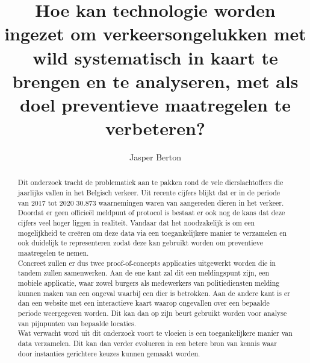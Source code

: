 \documentclass{hogent-article}
\title{Hoe kan technologie worden ingezet om verkeersongelukken met wild systematisch in kaart te brengen en te analyseren, met als doel preventieve maatregelen te verbeteren? }
\author{Jasper Berton}
\begin{document}
\begin{abstract}
    
   Dit onderzoek tracht de problematiek aan te pakken rond de vele dierslachtoffers die jaarlijks vallen in het Belgisch verkeer. Uit recente cijfers blijkt dat er in de periode van 2017 tot 2020 30.873 waarnemingen waren van aangereden dieren in het verkeer. Doordat er geen officieël meldpunt of protocol is bestaat er ook nog de kans dat deze cijfers veel hoger liggen in realiteit. Vandaar dat het noodzakelijk is om een mogelijkheid te creëren om deze data via een toegankelijkere manier te verzamelen en ook duidelijk te representeren zodat deze kan gebruikt worden om preventieve maatregelen te nemen. \\
   
   Concreet zullen er dus twee proof-of-concepts applicaties uitgewerkt worden die in tandem zullen samenwerken. Aan de ene kant zal dit een meldingspunt zijn, een mobiele applicatie, waar zowel burgers als medewerkers van politiediensten melding kunnen maken van een ongeval waarbij een dier is betrokken. Aan de andere kant is er dan een website met een interactieve kaart waarop ongevallen over een bepaalde periode weergegeven worden. Dit kan dan op zijn beurt gebruikt worden voor analyse van pijnpunten van bepaalde locaties. \\
   
   Wat verwacht word uit dit onderzoek voort te vloeien is een toegankelijkere manier van data verzamelen. Dit kan dan verder evolueren in een betere bron van kennis waar door instanties gerichtere keuzes kunnen gemaakt worden.
 
\end{abstract}

\tableofcontents



\printbibliography[heading=bibintoc]
\end{document}
